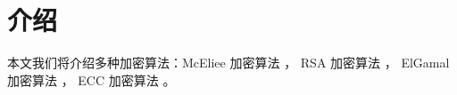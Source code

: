 \section{介绍}

本文我们将介绍多种加密算法：McEliee 加密算法 \cite{McEliece1978} ， RSA
加密算法 \cite{Rivest1983} ， ElGamal 加密算法 \cite{ElGamal1985} ， ECC
加密算法 \cite{Koblitz1987} 。

